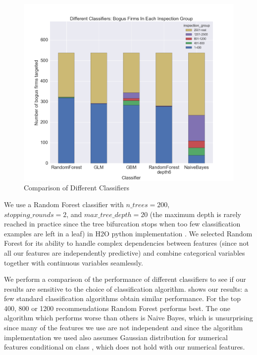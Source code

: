 \begin{figure}
  \includegraphics[width=1\columnwidth, page=1]{graphs/DifferentClassifiersPerformanceByInspectionGroup.png}
  \caption{Comparison of Different Classifiers}
  \label{fig:differentclassifiers}
\end{figure}

We use a Random Forest \cite{liaw2002classification} classifier with $n\_trees=200$,\\ $stopping\_rounds=2$, and $max\_tree\_depth=20$ (the maximum depth is rarely reached in practice since the tree bifurcation stops when too few classification examples are left in a leaf) in H2O python implementation \cite{h2o_Python_module}. We selected Random Forest for its ability to handle complex dependencies between features (since not all our features are independently predictive) and combine categorical variables together with continuous variables seamlessly. 

We perform a comparison of the performance of different classifiers to see if our results are sensitive to the choice of classification algorithm.  shows our results: a few  standard classification algorithms obtain similar performance. For the top 400, 800 or 1200 recommendations Random Forest performs best. The one algorithm which performs worse than others is Naive Bayes, which is unsurprising since many of the features we use are not independent and since the algorithm implementation we used also assumes Gaussian distribution for numerical features conditional on class \cite{h2o_NaiveBayes}, which does not hold with our numerical features.

